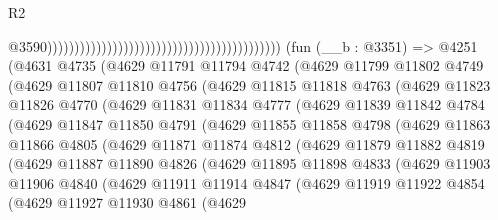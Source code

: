 \begin{lexlean}{R2}
\begin{coremodule}
                                                                                          @3590)))))))))))))))))))))))))))))))))))))))))))
    (fun (__b : @3351) =>
    @4251
      (@4631
        @4735
        (@4629
          @11791
          @11794
          @4742
          (@4629
            @11799
            @11802
            @4749
            (@4629
              @11807
              @11810
              @4756
              (@4629
                @11815
                @11818
                @4763
                (@4629
                  @11823
                  @11826
                  @4770
                  (@4629
                    @11831
                    @11834
                    @4777
                    (@4629
                      @11839
                      @11842
                      @4784
                      (@4629
                        @11847
                        @11850
                        @4791
                        (@4629
                          @11855
                          @11858
                          @4798
                          (@4629
                            @11863
                            @11866
                            @4805
                            (@4629
                              @11871
                              @11874
                              @4812
                              (@4629
                                @11879
                                @11882
                                @4819
                                (@4629
                                  @11887
                                  @11890
                                  @4826
                                  (@4629
                                    @11895
                                    @11898
                                    @4833
                                    (@4629
                                      @11903
                                      @11906
                                      @4840
                                      (@4629
                                        @11911
                                        @11914
                                        @4847
                                        (@4629
                                          @11919
                                          @11922
                                          @4854
                                          (@4629
                                            @11927
                                            @11930
                                            @4861
                                            (@4629

\end{coremodule}
\end{lexlean}
